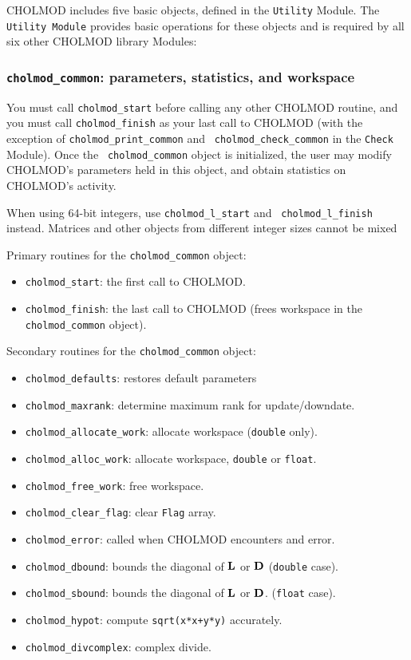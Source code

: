 \documentclass[11pt]{article}
\newcommand{\m}[1]{{\bf{#1}}}       %
\begin{document}
CHOLMOD includes five basic objects, defined in the {\tt Utility} Module.
The {\tt Utility Module} provides basic operations for these objects
and is required by all six other CHOLMOD library Modules:

\subsubsection{{\tt cholmod\_common}: parameters, statistics, and workspace}
    You must call {\tt cholmod\_start} before calling any other CHOLMOD
    routine, and you must call {\tt cholmod\_finish} as your last call to
    CHOLMOD (with the exception of {\tt cholmod\_print\_common} and {\tt
    cholmod\_check\_common} in the {\tt Check} Module).  Once the {\tt
    cholmod\_common} object is initialized, the user may modify CHOLMOD's
    parameters held in this object, and obtain statistics on CHOLMOD's
    activity.

    When using 64-bit integers, use {\tt cholmod\_l\_start} and {\tt
    cholmod\_l\_finish} instead.  Matrices and other objects from different
    integer sizes cannot be mixed

\vspace{0.1in}
\noindent Primary routines for the {\tt cholmod\_common} object:
    \begin{itemize}
    \item {\tt cholmod\_start}: the first call to CHOLMOD.
    \item {\tt cholmod\_finish}: the last call to CHOLMOD (frees workspace in
        the {\tt cholmod\_common} object).
    \end{itemize}

\noindent Secondary routines for the {\tt cholmod\_common} object:
    \begin{itemize}
    \item {\tt cholmod\_defaults}: restores default parameters
    \item {\tt cholmod\_maxrank}: determine maximum rank for update/downdate.
    \item {\tt cholmod\_allocate\_work}: allocate workspace ({\tt double} only).
    \item {\tt cholmod\_alloc\_work}: allocate workspace,
        {\tt double} or {\tt float}.
    \item {\tt cholmod\_free\_work}: free workspace.
    \item {\tt cholmod\_clear\_flag}: clear {\tt Flag} array.
    \item {\tt cholmod\_error}: called when CHOLMOD encounters and error.
    \item {\tt cholmod\_dbound}: bounds the diagonal of $\m{L}$ or $\m{D}$
        ({\tt double} case).
    \item {\tt cholmod\_sbound}: bounds the diagonal of $\m{L}$ or $\m{D}$.
        ({\tt float} case).
    \item {\tt cholmod\_hypot}: compute {\tt sqrt(x*x+y*y)} accurately.
    \item {\tt cholmod\_divcomplex}: complex divide.
    \end{itemize}
\end{document}
